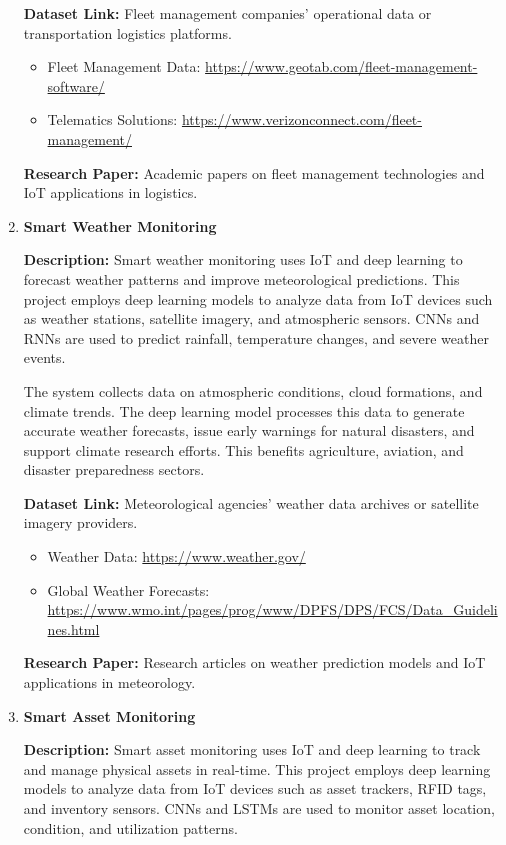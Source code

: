\documentclass{article}
\begin{document}
\begin{enumerate}[label=\textbf{\arabic*.}, leftmargin=*]
\textbf{Dataset Link:} Fleet management companies' operational data or transportation logistics platforms.
\begin{itemize}
    \item Fleet Management Data: \url{https://www.geotab.com/fleet-management-software/}
    \item Telematics Solutions: \url{https://www.verizonconnect.com/fleet-management/}
\end{itemize}

\textbf{Research Paper:} Academic papers on fleet management technologies and IoT applications in logistics.

\item \textbf{Smart Weather Monitoring}

\textbf{Description:}
Smart weather monitoring uses IoT and deep learning to forecast weather patterns and improve meteorological predictions. This project employs deep learning models to analyze data from IoT devices such as weather stations, satellite imagery, and atmospheric sensors. CNNs and RNNs are used to predict rainfall, temperature changes, and severe weather events.

The system collects data on atmospheric conditions, cloud formations, and climate trends. The deep learning model processes this data to generate accurate weather forecasts, issue early warnings for natural disasters, and support climate research efforts. This benefits agriculture, aviation, and disaster preparedness sectors.

\textbf{Dataset Link:} Meteorological agencies' weather data archives or satellite imagery providers.
\begin{itemize}
    \item Weather Data: \url{https://www.weather.gov/}
    \item Global Weather Forecasts: \url{https://www.wmo.int/pages/prog/www/DPFS/DPS/FCS/Data_Guidelines.html}
\end{itemize}

\textbf{Research Paper:} Research articles on weather prediction models and IoT applications in meteorology.

\item \textbf{Smart Asset Monitoring}

\textbf{Description:}
Smart asset monitoring uses IoT and deep learning to track and manage physical assets in real-time. This project employs deep learning models to analyze data from IoT devices such as asset trackers, RFID tags, and inventory sensors. CNNs and LSTMs are used to monitor asset location, condition, and utilization patterns.


\end{enumerate}
\end{document}
